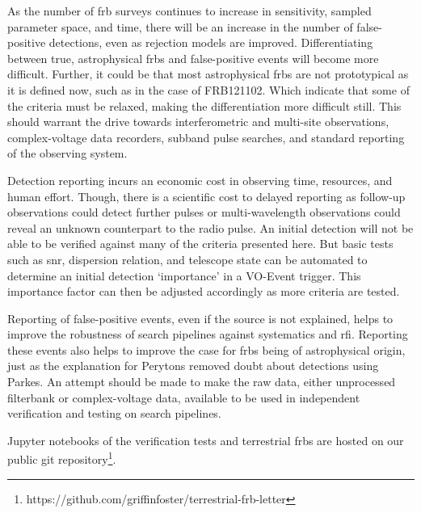 \documentclass[a4paper,fleqn,usenatbib]{mnras}
\begin{document}
As the number of \gls{frb} surveys continues to increase in sensitivity, sampled
parameter space, and time, there will be an increase in the number of
false-positive detections, even as rejection models are improved.
Differentiating between true, astrophysical \glspl{frb} and false-positive
events will become more difficult.  Further, it could be that most astrophysical
\glspl{frb} are not prototypical as it is defined now, such as in the case of
FRB121102. Which indicate that some of the criteria must be relaxed,
making the differentiation more difficult still.  This should warrant the drive
towards interferometric and multi-site observations, complex-voltage data
recorders, subband pulse searches, and standard reporting of the observing
system.

Detection reporting incurs an economic cost in observing time, resources, and
human effort. Though, there is a scientific cost to delayed reporting as
follow-up observations could detect further pulses or multi-wavelength
observations could reveal an unknown counterpart to the radio pulse. An initial
detection will not be able to be verified against many of the criteria presented
here. But basic tests such as \gls{snr}, dispersion relation, and telescope
state can be automated to determine an initial detection `importance' in a
VO-Event trigger. This importance factor can then be adjusted accordingly as
more criteria are tested.

Reporting of false-positive events, even if the source is not explained, helps
to improve the robustness of search pipelines against systematics and \gls{rfi}.
Reporting these events also helps to improve the case for \glspl{frb} being of
astrophysical origin, just as the explanation for Perytons
\citep{2015MNRAS.451.3933P} removed doubt about detections using Parkes. An
attempt should be made to make the raw data, either unprocessed filterbank or
complex-voltage data, available to be used in independent verification and
testing on search pipelines.

Jupyter notebooks of the verification tests and terrestrial \glspl{frb} are
hosted on our public git
repository\footnote{https://github.com/griffinfoster/terrestrial-frb-letter}.


 

\bsp	%
\label{lastpage}
\end{document}
